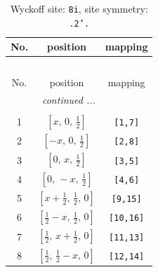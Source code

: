 \documentclass[fleqn,8pt]{jsarticle}
\begin{document}
\begin{longtable}{ccc}
\caption{Wyckoff site: {\tt 8i}, site symmetry: {\tt .2'.}}
 \\
 \hline \hline
No. & position & mapping \\ \hline \endfirsthead

\multicolumn{2}{l}{\tablename\ \thetable{}} \\
 \hline \hline
No. & position & mapping \\ \hline \endhead

 \hline \hline
\multicolumn{2}{r}{\footnotesize\it continued ...} \\ \endfoot

 \hline \hline
\multicolumn{2}{r}{} \\ \endlastfoot

1 & $\left[ x,\, 0,\, \frac{1}{2} \right]$ & {\tt [1,7]} \\ \hline
2 & $\left[ - x,\, 0,\, \frac{1}{2} \right]$ & {\tt [2,8]} \\ \hline
3 & $\left[ 0,\, x,\, \frac{1}{2} \right]$ & {\tt [3,5]} \\ \hline
4 & $\left[ 0,\, - x,\, \frac{1}{2} \right]$ & {\tt [4,6]} \\ \hline
5 & $\left[ x + \frac{1}{2},\, \frac{1}{2},\, 0 \right]$ & {\tt [9,15]} \\ \hline
6 & $\left[ \frac{1}{2} - x,\, \frac{1}{2},\, 0 \right]$ & {\tt [10,16]} \\ \hline
7 & $\left[ \frac{1}{2},\, x + \frac{1}{2},\, 0 \right]$ & {\tt [11,13]} \\ \hline
8 & $\left[ \frac{1}{2},\, \frac{1}{2} - x,\, 0 \right]$ & {\tt [12,14]} \\
\end{longtable}
\renewcommand{\arraystretch}{1.2}
\end{document}
